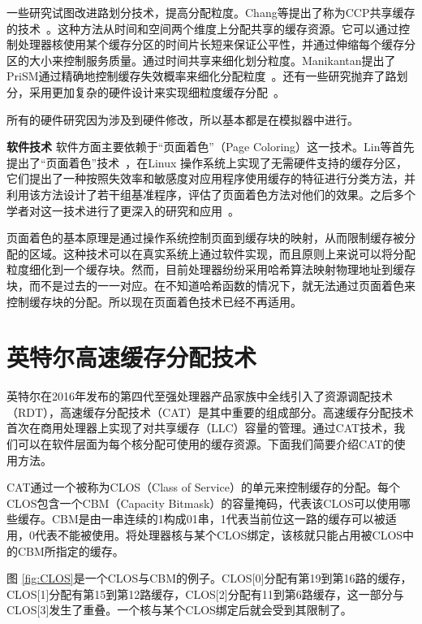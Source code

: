 一些研究试图改进路划分技术，提高分配粒度。Chang等提出了称为CCP共享缓存的技术~\parencite{chang2006cooperative,chang2014cooperative}。这种方法从时间和空间两个维度上分配共享的缓存资源。它可以通过控制处理器核使用某个缓存分区的时间片长短来保证公平性，并通过伸缩每个缓存分区的大小来控制服务质量。通过时间共享来细化划分粒度。Manikantan提出了PriSM通过精确地控制缓存失效概率来细化分配粒度~\parencite{manikantan2012probabilistic}。还有一些研究抛弃了路划分，采用更加复杂的硬件设计来实现细粒度缓存分配~\parencite{sanchez2011vantage}。

所有的硬件研究因为涉及到硬件修改，所以基本都是在模拟器中进行。

\textbf{软件技术}
软件方面主要依赖于“页面着色”（Page Coloring）这一技术。Lin等首先提出了“页面着色”技术~\parencite{lin2008gaining}，在Linux 操作系统上实现了无需硬件支持的缓存分区，它们提出了一种按照失效率和敏感度对应用程序使用缓存的特征进行分类方法，并利用该方法设计了若干组基准程序，评估了页面着色方法对他们的效果。之后多个学者对这一技术进行了更深入的研究和应用~\parencite{zhang2009towards,soares2008reducing,tam2007managing,azimi2009enhancing,lu2009soft}。

页面着色的基本原理是通过操作系统控制页面到缓存块的映射，从而限制缓存被分配的区域。这种技术可以在真实系统上通过软件实现，而且原则上来说可以将分配粒度细化到一个缓存块。然而，目前处理器纷纷采用哈希算法映射物理地址到缓存块，而不是过去的一一对应。在不知道哈希函数的情况下，就无法通过页面着色来控制缓存块的分配。所以现在页面着色技术已经不再适用。

\section{英特尔高速缓存分配技术}
英特尔在2016年发布的第四代至强处理器产品家族中全线引入了资源调配技术（RDT），高速缓存分配技术（CAT）是其中重要的组成部分。高速缓存分配技术首次在商用处理器上实现了对共享缓存（LLC）容量的管理。通过CAT技术，我们可以在软件层面为每个核分配可使用的缓存资源。下面我们简要介绍CAT的使用方法。

CAT通过一个被称为CLOS（Class of Service）的单元来控制缓存的分配。每个CLOS包含一个CBM（Capacity Bitmask）的容量掩码，代表该CLOS可以使用哪些缓存。CBM是由一串连续的1构成01串，1代表当前位这一路的缓存可以被适用，0代表不能被使用。将处理器核与某个CLOS绑定，该核就只能占用被CLOS中的CBM所指定的缓存。

图 \ref{fig:CLOS}是一个CLOS与CBM的例子。CLOS[0]分配有第19到第16路的缓存，CLOS[1]分配有第15到第12路缓存，CLOS[2]分配有11到第6路缓存，这一部分与CLOS[3]发生了重叠。一个核与某个CLOS绑定后就会受到其限制了。


